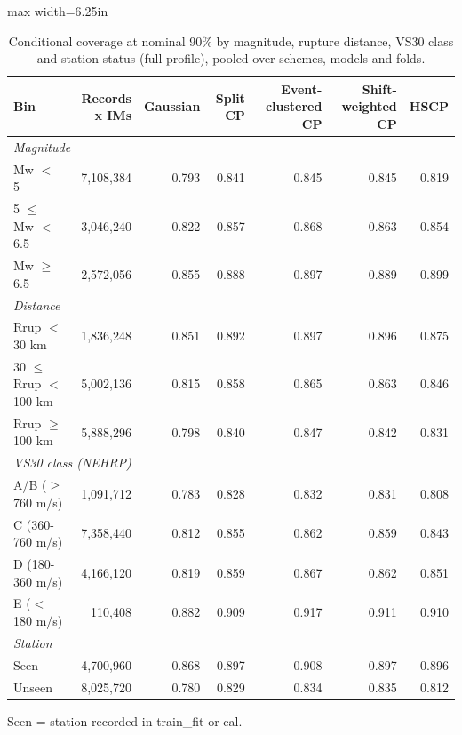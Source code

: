 \begin{table}[htbp]
\centering
\caption{Conditional coverage at nominal 90\% by magnitude, rupture distance, VS30 class and station status (full profile), pooled over schemes, models and folds.}
\label{tab:table5_conditional_coverage}
\small
\begin{adjustbox}{max width=6.25in}
\begin{tabular}{lrrrrrr}
\toprule
Bin & Records x IMs & Gaussian & Split CP & Event-clustered CP & Shift-weighted CP & HSCP \\
\midrule
\multicolumn{7}{l}{\textit{Magnitude}} \\
Mw $<$ 5 & 7,108,384 & 0.793 & 0.841 & 0.845 & 0.845 & 0.819 \\
5 $\leq$ Mw $<$ 6.5 & 3,046,240 & 0.822 & 0.857 & 0.868 & 0.863 & 0.854 \\
Mw $\geq$ 6.5 & 2,572,056 & 0.855 & 0.888 & 0.897 & 0.889 & 0.899 \\
\midrule
\multicolumn{7}{l}{\textit{Distance}} \\
Rrup $<$ 30 km & 1,836,248 & 0.851 & 0.892 & 0.897 & 0.896 & 0.875 \\
30 $\leq$ Rrup $<$ 100 km & 5,002,136 & 0.815 & 0.858 & 0.865 & 0.863 & 0.846 \\
Rrup $\geq$ 100 km & 5,888,296 & 0.798 & 0.840 & 0.847 & 0.842 & 0.831 \\
\midrule
\multicolumn{7}{l}{\textit{VS30 class (NEHRP)}} \\
A/B ($\geq$ 760 m/s) & 1,091,712 & 0.783 & 0.828 & 0.832 & 0.831 & 0.808 \\
C (360-760 m/s) & 7,358,440 & 0.812 & 0.855 & 0.862 & 0.859 & 0.843 \\
D (180-360 m/s) & 4,166,120 & 0.819 & 0.859 & 0.867 & 0.862 & 0.851 \\
E ($<$ 180 m/s) & 110,408 & 0.882 & 0.909 & 0.917 & 0.911 & 0.910 \\
\midrule
\multicolumn{7}{l}{\textit{Station}} \\
Seen & 4,700,960 & 0.868 & 0.897 & 0.908 & 0.897 & 0.896 \\
Unseen & 8,025,720 & 0.780 & 0.829 & 0.834 & 0.835 & 0.812 \\
\bottomrule
\end{tabular}
\end{adjustbox}
\par\smallskip
\parbox{6.25in}{\footnotesize Seen = station recorded in train\_fit or cal.}
\end{table}
